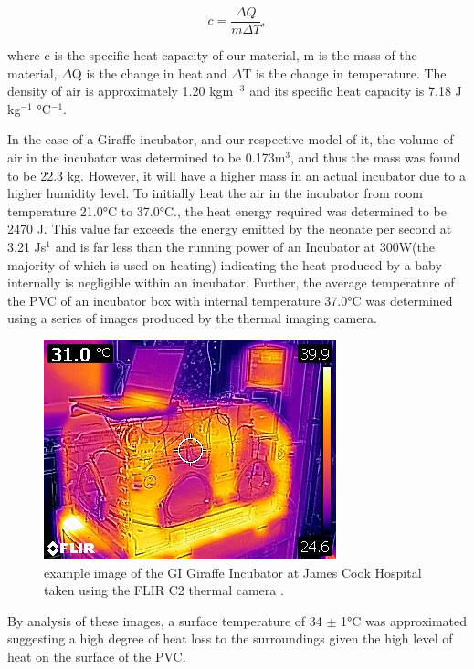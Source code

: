 \documentclass{article}
\begin{document}
\begin{equation}\label{a}
    c=\frac{\Delta Q}{m \Delta T},
\end{equation}


where c is the specific heat capacity of our material, m is the mass of the material, $\Delta$Q is the change in heat and $\Delta$T is the change in temperature.  The density of air is approximately 1.20 kgm$^{-3}$  \cite{BTT7} and its specific heat capacity is 7.18 J kg$^{-1}$ °C$^{-1 }$.

 \vspace{3mm}

In the case of a Giraffe incubator, and our respective model of it, the volume of air in the incubator was determined to be 0.173m$^{3}$, and thus the mass was found to be 22.3 kg. However, it will have a higher mass in an actual incubator due to a higher humidity level. To initially heat the air in the incubator from room temperature 21.0°C to 37.0°C., the heat energy required was determined to be 2470 J. This value far exceeds the energy emitted by the neonate per second at 3.21 Js$^{1}$  and is far less than the running power of an Incubator at 300W(the majority of which is used on heating) \cite{BTT8} indicating the heat produced by a baby internally is negligible within an incubator. Further, the average temperature of the PVC of an incubator box with internal temperature 37.0°C was determined using a series of images produced by the thermal imaging camera. 

\begin{figure}[H]
\centering
\begin{minipage}{.48\linewidth}
    \captionsetup{justification=centering,margin=0.1cm}
    \includegraphics[width=\textwidth]{Sample Thermal Imagining Camera.jpg}
    \caption{example image of the GI Giraffe Incubator at James Cook Hospital taken using the FLIR C2 thermal camera .}
\end{minipage}
\hfill
\end{figure}
By analysis of these images, a surface temperature of 34 $\pm$ 1°C was approximated suggesting a high degree of heat loss to the surroundings given the high level of heat on the surface of the PVC. 
\vspace{3mm}
 
\end{document}
